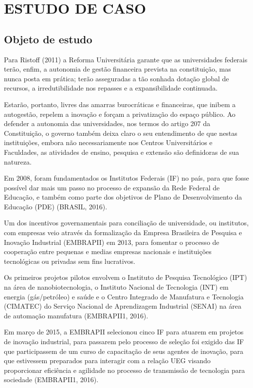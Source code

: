 \chapter{ESTUDO DE CASO}
\thispagestyle{empty}

\section{Objeto de estudo}

Para Ristoff (2011) a Reforma Universitária garante que as universidades federais terão, enfim, a autonomia de gestão financeira prevista na constituição, mas nunca posta em prática; terão asseguradas a tão sonhada dotação global de recursos, a irredutibilidade nos repasses e a expansibilidade continuada.

Estarão, portanto, livres das amarras burocráticas e financeiras, que inibem a autogestão, repelem a inovação e forçam a privatização do espaço público. Ao defender a autonomia das universidades, nos termos do artigo 207 da Constituição, o governo também deixa claro o seu entendimento de que nestas instituições, embora não necessariamente nos Centros Universitários e Faculdades, as atividades de ensino, pesquisa e extensão são definidoras de sua natureza.

Em 2008, foram fundamentados os Institutos Federais (IF) no país, para que fosse possível dar mais um passo no processo de expansão da Rede Federal de Educação, e também como parte dos objetivos de Plano de Desenvolvimento da Educação (PDE) (BRASIL, 2016).

Um dos incentivos governamentais para conciliação de universidade, ou institutos, com empresas veio através da formalização da Empresa Brasileira de Pesquisa e Inovação Industrial (EMBRAPII) em 2013, para fomentar o processo de cooperação entre pequenas  e medias empresas nacionais e instituições tecnológicas ou privadas sem fins lucrativos.

Os primeiros projetos pilotos envolvem o Instituto de Pesquisa Tecnológico (IPT) na área de nanobiotecnologia, o Instituto Nacional de Tecnologia (INT) em energia (gás/petróleo) e saúde e o Centro Integrado de Manufatura e Tecnologia (CIMATEC) do Serviço Nacional de Aprendizagem Industrial (SENAI) na área de automação manufatura (EMBRAPII1, 2016).

Em março de 2015, a EMBRAPII selecionou cinco IF para atuarem em projetos de inovação industrial, para passarem pelo processo de seleção foi exigido das IF que participassem de um curso de capacitação de seus agentes de inovação, para que estivessem preparados para interagir com a relação UEG visando proporcionar eficiência  e agilidade no processo de transmissão de tecnologia para sociedade (EMBRAPII1, 2016).

